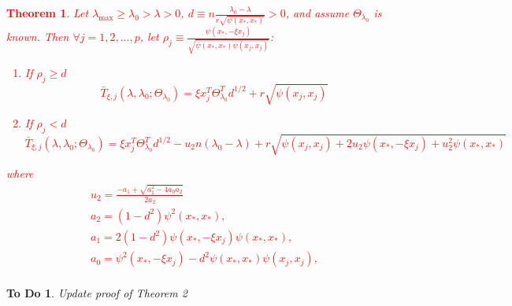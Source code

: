\documentclass{article}
\newtheorem{theorem}{Theorem}
\newtheorem{todo}{To Do}
\providecommand{\note}[1]{\textcolor{red}{#1}}
\begin{document}
\note{
\begin{theorem}
    Let $\lambda_\max\geq\lambda_0>\lambda>0$, $d\equiv n\frac{\lambda_0-\lambda}{r\sqrt{\psi(x_*,x_*)}}>0$, and assume $\Theta_{\lambda_0}$ is known. Then $\forall j =1,2,...,p$, let $\rho_j\equiv\frac{\psi(x_*,-\xi x_j)}{\sqrt{\psi(x_*,x_*)\psi(x_j, x_j)}}$:
    \begin{enumerate}
        \item If $\rho_j\geq d$
        \begin{equation}
            \bar{T}_{\xi,j}(\lambda,\lambda_0;\Theta_{\lambda_0})=\xi x_j^T\Theta_{\lambda_0}^Td^{1/2}+r\sqrt{\psi(x_j,x_j)}
        \end{equation}
        \item If $\rho_j<d$
        \begin{equation}
            \bar{T}_{\xi,j}(\lambda,\lambda_0;\Theta_{\lambda_0})=\xi x_j^T\Theta_{\lambda_0}^Td^{1/2}-u_2n(\lambda_0-\lambda)+r\sqrt{\psi(x_j,x_j)+2u_2\psi(x_*,-\xi x_j)+u_2^2\psi(x_*,x_*)}
        \end{equation}
    \end{enumerate}   
    where
    \begin{equation}
        \begin{gathered}
            u_2=\frac{-a_1+\sqrt{a_1^2-4a_0a_2}}{2a_2}\\
            a_2=(1-d^2)\psi^2(x_*,x_*),\\
            a_1=2(1-d^2)\psi(x_*,-\xi x_j)\psi(x_*,x_*),\\
            a_0=\psi^2(x_*,-\xi x_j)-d^2\psi(x_*,x_*)\psi(x_j,x_j),\\
        \end{gathered}
    \end{equation}
\end{theorem}
}
\begin{todo}
    Update proof of Theorem 2
\end{todo}
\iffalse
\end{document}
